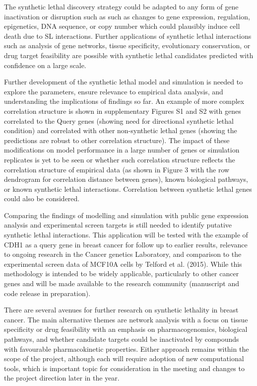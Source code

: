 The synthetic lethal discovery strategy could be adapted to any form of gene inactivation or disruption such as such as changes to gene expression, regulation, epigenetics, DNA sequence, or copy number which could plausibly induce cell death due to SL interactions.  Further applications of synthetic lethal interactions such as analysis of gene networks, tissue specificity, evolutionary conservation, or drug target feasibility are possible with synthetic lethal candidates predicted with confidence on a large scale.


Further development of the synthetic lethal model and simulation is needed to explore the parameters, ensure relevance to empirical data analysis, and understanding the implications of findings so far.  An example of more complex correlation structure is shown in supplementary Figures S1 and S2 with genes correlated to the Query genes (showing need for directional synthetic lethal condition) and correlated with other non-synthetic lethal genes (showing the predictions are robust to other correlation structure).  The impact of these modifications on model performance in a large number of genes or simulation replicates is yet to be seen or whether such correlation structure reflects the correlation structure of empirical data (as shown in Figure 3 with the row dendrogram for correlation distance between genes), known biological pathways, or known synthetic lethal interactions. Correlation between synthetic lethal genes could also be considered.

Comparing the findings of modelling and simulation with public gene expression analysis and experimental screen targets is still needed to identify putative synthetic lethal interactions.  This application will be tested with the example of CDH1 as a query gene in breast cancer for follow up to earlier results, relevance to ongoing research in the Cancer genetics Laboratory, and comparison to the experimental screen data of MCF10A cells by Telford et al. (2015).  While this methodology is intended to be widely applicable, particularly to other cancer genes and will be made available to the research community (manuscript and code release in preparation).

There are several avenues for further research on synthetic lethality in breast cancer. The main alternative themes are network analysis with a focus on tissue specificity or drug feasibility with an emphasis on pharmacogenomics, biological pathways, and whether candidate targets could be inactivated by compounds with favourable pharmacokinetic properties. Either approach remains within the scope of the project, although each will require adoption of new computational tools, which is important topic for consideration in the meeting and changes to the project direction later in the year.
\fi

